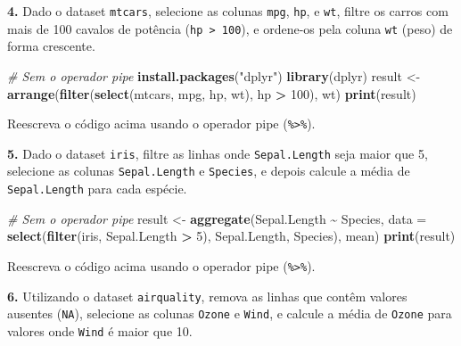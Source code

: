 \documentclass[
]{book}
\newenvironment{Shaded}{\begin{snugshade}}{\end{snugshade}}
\newcommand{\AttributeTok}[1]{\textcolor[rgb]{0.13,0.29,0.53}{#1}}
\newcommand{\CommentTok}[1]{\textcolor[rgb]{0.56,0.35,0.01}{\textit{#1}}}
\newcommand{\DecValTok}[1]{\textcolor[rgb]{0.00,0.00,0.81}{#1}}
\newcommand{\FunctionTok}[1]{\textcolor[rgb]{0.13,0.29,0.53}{\textbf{#1}}}
\newcommand{\NormalTok}[1]{#1}
\newcommand{\OtherTok}[1]{\textcolor[rgb]{0.56,0.35,0.01}{#1}}
\newcommand{\SpecialCharTok}[1]{\textcolor[rgb]{0.81,0.36,0.00}{\textbf{#1}}}
\newcommand{\StringTok}[1]{\textcolor[rgb]{0.31,0.60,0.02}{#1}}
\begin{document}
\textbf{4.} Dado o dataset \texttt{mtcars}, selecione as colunas \texttt{mpg}, \texttt{hp}, e \texttt{wt}, filtre os carros com mais de 100 cavalos de potência (\texttt{hp\ \textgreater{}\ 100}), e ordene-os pela coluna \texttt{wt} (peso) de forma crescente.

\begin{Shaded}
\begin{Highlighting}[]
\CommentTok{\# Sem o operador pipe}
\FunctionTok{install.packages}\NormalTok{(}\StringTok{"dplyr"}\NormalTok{)}
\FunctionTok{library}\NormalTok{(dplyr)}
\NormalTok{result }\OtherTok{\textless{}{-}} \FunctionTok{arrange}\NormalTok{(}\FunctionTok{filter}\NormalTok{(}\FunctionTok{select}\NormalTok{(mtcars, mpg, hp, wt), hp }\SpecialCharTok{\textgreater{}} \DecValTok{100}\NormalTok{), wt)}
\FunctionTok{print}\NormalTok{(result)}
\end{Highlighting}
\end{Shaded}

Reescreva o código acima usando o operador pipe (\texttt{\%\textgreater{}\%}).

\textbf{5.} Dado o dataset \texttt{iris}, filtre as linhas onde \texttt{Sepal.Length} seja maior que 5, selecione as colunas \texttt{Sepal.Length} e \texttt{Species}, e depois calcule a média de \texttt{Sepal.Length} para cada espécie.

\begin{Shaded}
\begin{Highlighting}[]
\CommentTok{\# Sem o operador pipe}
\NormalTok{result }\OtherTok{\textless{}{-}} \FunctionTok{aggregate}\NormalTok{(Sepal.Length }\SpecialCharTok{\textasciitilde{}}\NormalTok{ Species, }\AttributeTok{data =} \FunctionTok{select}\NormalTok{(}\FunctionTok{filter}\NormalTok{(iris, Sepal.Length }\SpecialCharTok{\textgreater{}} \DecValTok{5}\NormalTok{), Sepal.Length, Species), mean)}
\FunctionTok{print}\NormalTok{(result)}
\end{Highlighting}
\end{Shaded}

Reescreva o código acima usando o operador pipe (\texttt{\%\textgreater{}\%}).

\textbf{6.} Utilizando o dataset \texttt{airquality}, remova as linhas que contêm valores ausentes (\texttt{NA}), selecione as colunas \texttt{Ozone} e \texttt{Wind}, e calcule a média de \texttt{Ozone} para valores onde \texttt{Wind} é maior que 10.

\begin{Shaded}
\end{Shaded}
\end{document}
